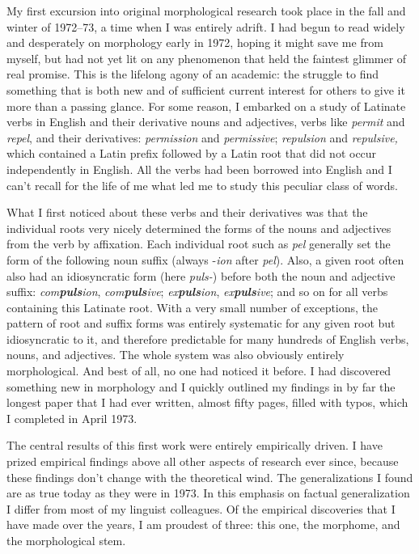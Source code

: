 \documentclass[output=paper]{langsci/langscibook}
\begin{document}
My first excursion into original morphological research took place in
the fall and winter of 1972--73, a time when I was entirely adrift. I had
begun to read widely and desperately on morphology early in 1972, hoping
it might save me from myself, but had not yet lit on any phenomenon that
held the faintest glimmer of real promise. This is the lifelong agony of
an academic: the struggle to find something that is both new and of
sufficient current interest for others to give it more than a passing
glance. For some reason, I embarked on a study of Latinate verbs in
English and their derivative nouns and adjectives, verbs like
\emph{permit} and \emph{repel}, and their derivatives: \emph{permission}
and \emph{permissive}; \emph{repulsion} and \emph{repulsive,} which
contained a Latin prefix followed by a Latin root that did not occur
independently in English. All the verbs had been borrowed into English
and I can't recall for the life of me what led me to study this peculiar
class of words.

What I first noticed about these verbs and their derivatives was that
the individual roots very nicely determined the forms of the nouns and
adjectives from the verb by affixation. Each individual root such as
\emph{pel} generally set the form of the following noun suffix (always
-\emph{ion} after \emph{pel}). Also, a given root often also had an
idiosyncratic form (here \emph{puls-}) before both the noun and
adjective suffix: \emph{com\textbf{puls}ion},
\emph{com\textbf{puls}ive}; \emph{ex\textbf{puls}ion},
\emph{ex\textbf{puls}ive}; and so on for all verbs containing this
Latinate root. With a very small number of exceptions, the pattern of
root and suffix forms was entirely systematic for any given root but
idiosyncratic to it, and therefore predictable for many hundreds of
English verbs, nouns, and adjectives. The whole system was also
obviously entirely morphological. And best of all, no one had noticed it
before. I had discovered something new in morphology and I quickly
outlined my findings in by far the longest paper that I had ever
written, almost fifty pages, filled with typos, which I completed in
April 1973.

The central results of this first work were entirely empirically driven.
I have prized empirical findings above all other aspects of research
ever since, because these findings don't change with the theoretical
wind. The generalizations I found are as true today as they were in
1973. In this emphasis on factual generalization I differ from most of
my linguist colleagues. Of the empirical discoveries that I have made
over the years, I am proudest of three: this one, the morphome, and the
morphological stem.
\end{document}
